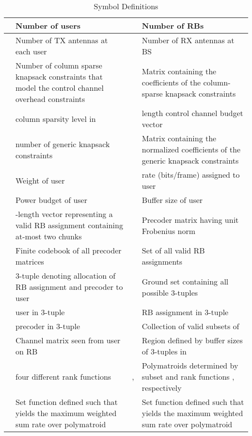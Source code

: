 \documentclass[11pt] {article}
\begin{document}
\begin{table}
\begin{footnotesize}
\begin{center}
\hspace{-1cm}\caption[]{Symbol Definitions}\label{tab:defnsym}
\begin{tabular}{|c|p{4cm}|p{4cm}|p{4cm}|}\hline
    & Number of users &   & Number of RBs \\ \hline   & Number of TX antennas at each user &
    & Number of RX antennas at BS \\ \hline   & Number of column sparse knapsack constraints that model the control channel overhead constraints  &  & Matrix containing the coefficients of the column-sparse knapsack constraints   \\ \hline
    & column sparsity level in  &  &  length control channel budget vector       \\  \hline  & number of generic knapsack constraints &      & Matrix containing the normalized coefficients of the generic knapsack constraints   \\\hline
  & Weight of  user    &  & rate (bits/frame) assigned to user  \\ \hline    & Power budget of user  &  & Buffer size of user  \\\hline
      & -length vector representing a valid RB assignment containing at-most two chunks &     & Precoder matrix having unit Frobenius norm \\ \hline   & Finite codebook of all precoder matrices &
      & Set of all valid RB assignments \\ \hline   & 3-tuple denoting allocation of RB assignment  and precoder  to user  &  & Ground set containing all possible 3-tuples \\ \hline   & user in 3-tuple  &   & RB assignment in 3-tuple  \\ \hline   & precoder in 3-tuple  &
      & Collection of valid subsets of  \\ \hline   & Channel matrix seen from user  on RB   &  & Region defined by buffer sizes of 3-tuples in          \\  \hline
           & four different rank functions & ,   & Polymatroids determined by subset  and rank functions , respectively \\  \hline  &  Set function defined such that  yields the maximum weighted sum rate over polymatroid  &  &  Set function defined such that  yields the maximum weighted sum rate over polymatroid \\ \hline \end{tabular}
\end{center}
\end{footnotesize}
\end{table}
\end{document}
